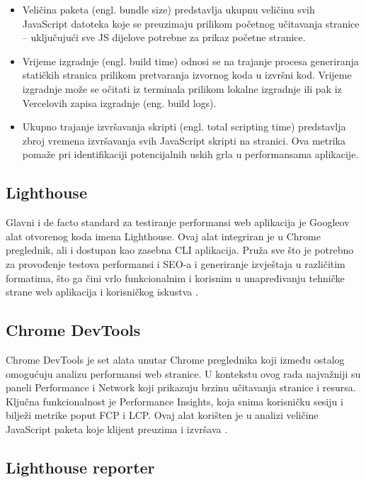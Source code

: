 \begin{itemize}
    \item Veličina paketa (engl. bundle size) predstavlja ukupnu veličinu svih JavaScript datoteka koje se preuzimaju prilikom početnog učitavanja stranice – uključujući sve JS dijelove potrebne za prikaz početne stranice.
    \item Vrijeme izgradnje (engl. build time) odnosi se na trajanje procesa generiranja statičkih stranica prilikom pretvaranja izvornog koda u izvršni kod. Vrijeme izgradnje može se očitati iz terminala prilikom lokalne izgradnje ili pak iz Vercelovih zapisa izgradnje (eng. build logs).
    \item Ukupno trajanje izvršavanja skripti (engl. total scripting time) predstavlja zbroj vremena izvršavanja svih JavaScript skripti na stranici. Ova metrika pomaže pri identifikaciji potencijalnih uskih grla u performansama aplikacije.
\end{itemize}


\subsection{Lighthouse}

Glavni i de facto standard za testiranje performansi web aplikacija je Googleov alat otvorenog koda imena Lighthouse. Ovaj alat integriran je u Chrome preglednik, ali i dostupan kao zasebna CLI aplikacija. Pruža sve što je potrebno za provođenje testova performansi i SEO-a i generiranje izvještaja u različitim formatima, što ga čini vrlo funkcionalnim i korisnim u unapređivanju tehničke strane web aplikacija i korisničkog iskustva \cite{googlelighthouse}.

\subsection{Chrome DevTools}

Chrome DevTools je set alata unutar Chrome preglednika koji između ostalog omogućuju analizu performansi web stranice. U kontekstu ovog rada najvažniji su paneli Performance i Network koji prikazuju brzinu učitavanja stranice i resursa. Ključna funkcionalnost je Performance Insights, koja snima korisničku sesiju i bilježi metrike poput FCP i LCP. Ovaj alat korišten je u analizi veličine JavaScript paketa koje klijent preuzima i izvršava \cite{nordstrom2023comparison}.

\subsection{Lighthouse reporter}

